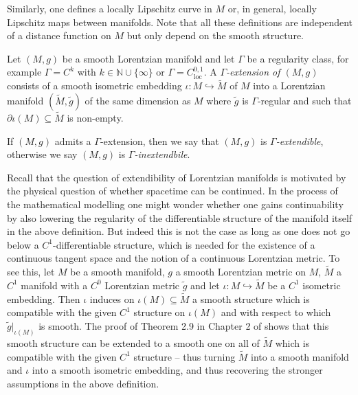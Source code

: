 \documentclass[reqno]{article}
\newcommand{\N}{\mathbb{N}}
\newcommand{\loc}{\mathrm{loc}}
\begin{document}
Similarly, one defines a locally Lipschitz curve in $M$ or, in general, locally Lipschitz maps between manifolds. Note that all these definitions are independent of a distance function on $M$ but only depend on the smooth structure.


\begin{definition}
Let $(M,g)$ be a smooth Lorentzian manifold and let $\Gamma$ be a regularity class, for example $\Gamma = C^k$ with $k \in \N \cup \{\infty\}$ or $\Gamma = C^{0,1}_{\loc}$.  A \emph{$\Gamma$-extension of $(M,g)$} consists of a smooth isometric embedding $\iota : M \hookrightarrow \tilde{M}$ of $M$ into a Lorentzian manifold $(\tilde{M}, \tilde{g})$ of the same dimension as $M$ where $\tilde{g}$ is $\Gamma$-regular  and such that $\partial \iota(M) \subseteq \tilde{M}$ is non-empty.

If $(M,g)$ admits a $\Gamma$-extension, then we say that $(M,g)$ is \emph{$\Gamma$-extendible}, otherwise we say $(M,g)$ is \emph{$\Gamma$-inextendbile}.
\end{definition}

\begin{remark}\label{RemEmbeddingSmooth}
Recall that the question of extendibility of Lorentzian manifolds is motivated by the physical question of whether spacetime can be continued. In the process of the mathematical modelling one might wonder whether one gains continuability by also lowering the regularity of the differentiable structure of the manifold itself in the above definition. But indeed this is not the case as long as one does not go below a $C^1$-differentiable structure, which is needed for the existence of a continuous tangent space and the notion of a continuous Lorentzian metric. To see this, let $M$ be a smooth manifold, $g$ a smooth Lorentzian metric on $M$, $\tilde{M}$ a $C^1$ manifold with a $C^0$ Lorentzian metric $\tilde{g}$ and let $\iota : M \hookrightarrow \tilde{M}$ be a $C^1$ isometric embedding. Then $\iota$ induces on $\iota(M) \subseteq \tilde{M}$ a smooth structure which is compatible with the given $C^1$ structure on $\iota(M)$ and with respect to which $\tilde{g}|_{\iota(M)}$ is smooth. The proof of Theorem 2.9 in Chapter 2 of \cite{Hirsch12} shows that this smooth structure can be extended to a smooth one on all of $\tilde{M}$ which is compatible with the given $C^1$ structure -- thus turning $\tilde{M}$ into a smooth manifold and $\iota$ into a smooth isometric embedding, and thus recovering the stronger assumptions in the above definition. 
\end{remark}
\end{document}
